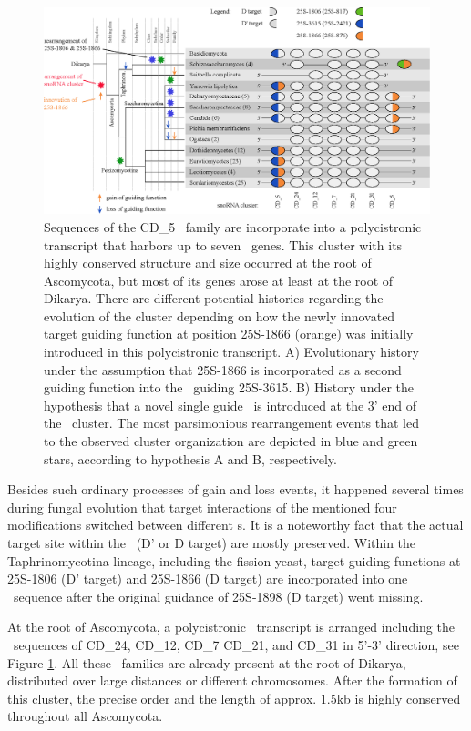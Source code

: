 \begin{figure}
  \centering
  \includegraphics[width=\textwidth]{pics/target_switches_CD_5_cluster.eps}
  \caption[Evolution of a \sno\ cluster harboring CD\_5
  sequences.]{Sequences of the CD\_5 \sno\ family are incorporate into
  a polycistronic transcript that harbors up to seven \sno\
  genes. This cluster with its highly conserved structure and size occurred at the root of Ascomycota, but most of
  its genes arose at least at the root of Dikarya. There are different
  potential histories regarding the evolution of the cluster depending on how
  the newly innovated target guiding function at position 25S-1866
  (orange) was initially introduced in this polycistronic
  transcript. A) Evolutionary history under the assumption that
  25S-1866 is incorporated as a second guiding function into the \sno\
  guiding 25S-3615. B) History under the hypothesis that a novel
  single guide \sno\ is introduced at the 3' end of the \sno\
  cluster. The most parsimonious rearrangement events that led to the
  observed cluster organization are depicted in
  blue and green stars, according to hypothesis A and B, respectively.}
\label{fig:CD_5_cluster_history}
\end{figure}

Besides such ordinary processes of gain and loss events, it happened
several times during fungal evolution that target interactions
of the mentioned four modifications switched between different \sno s.
It is a noteworthy fact that the actual target site within the \sno\
(D' or D target) are mostly preserved. Within the Taphrinomycotina
lineage, including the fission yeast, target guiding functions at
25S-1806 (D' target) and 25S-1866 (D target) are incorporated into one \sno\ sequence after
the original guidance of 25S-1898 (D target) went missing. 

At the root of Ascomycota, a polycistronic \sno\ transcript is
arranged including the \sno\ sequences of CD\_24, CD\_12,
CD\_7 CD\_21, and CD\_31 in 5'-3' direction, see Figure
\ref{fig:CD_5_cluster_history}.  All these \sno\ families
are already present at the root of Dikarya, distributed over large
distances or different chromosomes. After the formation of this
cluster, the precise order and the
length of approx. 1.5kb is highly conserved throughout all
Ascomycota. 


